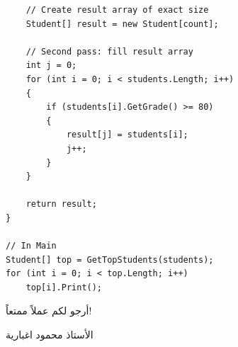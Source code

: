\documentclass[14pt]{extarticle}
\begin{document}
\begin{enumerate}
\begin{english}
\begin{verbatim}
    // Create result array of exact size
    Student[] result = new Student[count];

    // Second pass: fill result array
    int j = 0;
    for (int i = 0; i < students.Length; i++)
    {
        if (students[i].GetGrade() >= 80)
        {
            result[j] = students[i];
            j++;
        }
    }

    return result;
}

// In Main
Student[] top = GetTopStudents(students);
for (int i = 0; i < top.Length; i++)
    top[i].Print();
\end{verbatim}
\end{english}
\clearpage
\fi

\end{enumerate}

\vspace{1em}
\begin{flushleft}
أرجو لكم عملاً ممتعاً!

الأستاذ محمود اغبارية
\end{flushleft}
\end{document}
